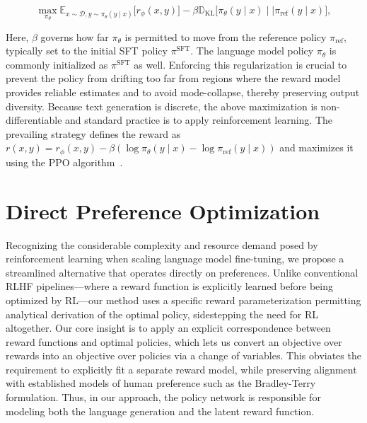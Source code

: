 \begin{equation}\label{eq:RL}
\max_{\pi_{\theta}}  \mathbb{E}_{x\sim \mathcal{D}, y\sim \pi_{\theta}(y \mid x)}\bigl[r_{\phi}(x, y)\bigr] - \beta\mathbb{D}_{\textrm{KL}}\bigl[\pi_{\theta}(y\mid x)\mid \mid \pi_\text{ref}(y\mid x)\bigr],
\end{equation}

Here, $\beta$ governs how far $\pi_\theta$ is permitted to move from the reference policy $\pi_\text{ref}$, typically set to the initial SFT policy $\pi^\text{SFT}$. The language model policy $\pi_\theta$ is commonly initialized as $\pi^\text{SFT}$ as well. Enforcing this regularization is crucial to prevent the policy from drifting too far from regions where the reward model provides reliable estimates and to avoid mode-collapse, thereby preserving output diversity. Because text generation is discrete, the above maximization is non-differentiable and standard practice is to apply reinforcement learning. The prevailing strategy \citep{ziegler2020finetuning, stiennon2022learning, bai2022training, ouyang2022training} defines the reward as ${r(x, y) = r_{\phi}(x, y) -\beta (\log \pi_{\theta}(y\mid x) - \log \pi_\text{ref}(y\mid x))}$ and maximizes it using the PPO algorithm~\cite{schulman2017proximal}.

\section{Direct Preference Optimization}\label{sec:DPO}

Recognizing the considerable complexity and resource demand posed by reinforcement learning when scaling language model fine-tuning, we propose a streamlined alternative that operates directly on preferences. Unlike conventional RLHF pipelines—where a reward function is explicitly learned before being optimized by RL—our method uses a specific reward parameterization permitting analytical derivation of the optimal policy, sidestepping the need for RL altogether. Our core insight is to apply an explicit correspondence between reward functions and optimal policies, which lets us convert an objective over rewards into an objective over policies via a change of variables. This obviates the requirement to explicitly fit a separate reward model, while preserving alignment with established models of human preference such as the Bradley-Terry formulation. Thus, in our approach, the policy network is responsible for modeling both the language generation and the latent reward function.

